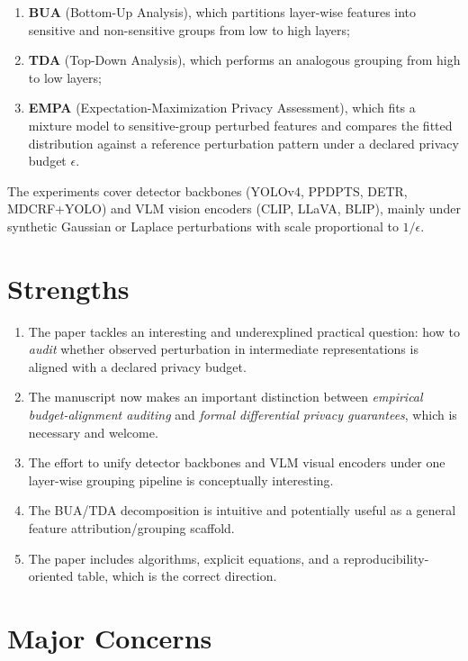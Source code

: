 \begin{enumerate}
\item \textbf{BUA} (Bottom-Up Analysis), which partitions layer-wise features into sensitive and non-sensitive groups from low to high layers;
\item \textbf{TDA} (Top-Down Analysis), which performs an analogous grouping from high to low layers;
\item \textbf{EMPA} (Expectation-Maximization Privacy Assessment), which fits a mixture model to sensitive-group perturbed features and compares the fitted distribution against a reference perturbation pattern under a declared privacy budget $\epsilon$.
\end{enumerate}

The experiments cover detector backbones (YOLOv4, PPDPTS, DETR, MDCRF+YOLO) and VLM vision encoders (CLIP, LLaVA, BLIP), mainly under synthetic Gaussian or Laplace perturbations with scale proportional to $1/\epsilon$.

\section*{Strengths}

\begin{enumerate}
\item The paper tackles an interesting and underexplined practical question: how to \emph{audit} whether observed perturbation in intermediate representations is aligned with a declared privacy budget.
\item The manuscript now makes an important distinction between \emph{empirical budget-alignment auditing} and \emph{formal differential privacy guarantees}, which is necessary and welcome.
\item The effort to unify detector backbones and VLM visual encoders under one layer-wise grouping pipeline is conceptually interesting.
\item The BUA/TDA decomposition is intuitive and potentially useful as a general feature attribution/grouping scaffold.
\item The paper includes algorithms, explicit equations, and a reproducibility-oriented table, which is the correct direction.
\end{enumerate}

\section*{Major Concerns}

